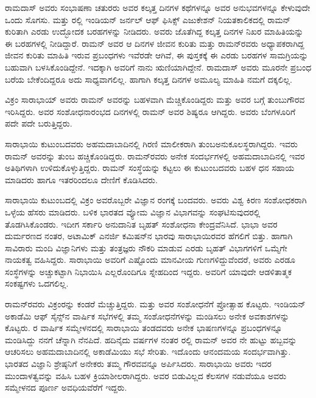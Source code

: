 ರಾಮದಾಸ್ ಅವರು ಸಂಭಾಷಣಾ ಚತುರರು ಅವರ ಕಲ್ಕತ್ತ ದಿನಗಳ ಕಥೆಗಳನ್ನೂ ಅವರ ಅನುಭವಗಳನ್ನೂ ಕೇಳುವುದೇ ಒಂದು ಸೊಗಸು.  ಮತ್ತು ರಲ್ಲಿ ಇಂಡಿಯನ್ ಜರ್ನಲ್ ಆಫ್ ಫಿಸಿಕ್ಸ್ ಎಜುಕೇಶನ್ ನಿಯತಕಾಲಿಕದಲ್ಲಿ ರಾಮನ್ ಕುರಿತಾಗಿ ಎರಡು ಉದ್ಭೋದಕ ಬರಹಗಳನ್ನು ನೀಡಿದರು. ಅವರು ಜೊತೆಗಿದ್ದ ಕಲ್ಕತ್ತ ದಿನಗಳ ನಿಖರ ಮಾಹಿತಿಯನ್ನು ಈ ಬರಹಗಳಲ್ಲಿ ನೀಡಿದ್ದಾರೆ. ರಾಮನ್ ಅವರ ಆ ದಿನಗಳ ಜೀವನ ಕುರಿತು ಮತ್ತು ರಾಮನ್‍ರವರು ಅಧ್ಯಾಪಕರಾಗಿದ್ದ ಜೀವನ ಕುರಿತು ಮಾಹಿತಿ ಇರುವ ಪ್ರಬಂಧಗಳು ಇವೆರಡೇ ಆಗಿವೆ, ಈ ಪುಸ್ತಕಕ್ಕೆ ಈ ಎರಡು ಬರಹಗಳ ಸಾಮಗ್ರಿಯನ್ನು ಬಹುವಾಗಿ ಬಳಸಿಕೊಂಡಿದ್ದೇನೆ. ಇದಕ್ಕಾಗಿ ಅವರಿಗೆ ನಾನು ಋಣಿಯಾಗಿದ್ದೇನೆ. ರಾಮದಾಸ್ ಅವರು ಮೂರನೇ ಪ್ರಬಂಧ ಬರೆಯ ಬೇಕೆಂದಿದ್ದರೂ ಅದು ಸಾಧ್ಯವಾಗಲಿಲ್ಲ. ಹಾಗಾಗಿ ಕಲ್ಕತ್ತ ದಿನಗಳ ಅಮೂಲ್ಯ ಮಾಹಿತಿ ನಮಗೆ ದಕ್ಕಲಿಲ್ಲ.



ವಿಕ್ರಂ ಸಾರಾಭಾಯ್ ಅವರು ರಾಮನ್ ಅವರನ್ನು ಬಹಳವಾಗಿ ಮೆಚ್ಚಿಕೊಂಡಿದ್ದರು ಮತ್ತು ಅವರ ಬಗ್ಗೆ ತುಂಬುಗೌರವ ಇರಿಸಿದ್ದರು. ಅವರ ಸಂಶೋಧನಾರಂಭದ ದಿನಗಳಲ್ಲಿ ರಾಮನ್ ಅವರ ಶಿಷ್ಯರೂ ಆಗಿದ್ದರು. ಅವರು ಬೆಂಗಳೂರಿಗೆ ಪದೇ ಪದೇ ಬರುತ್ತಿದ್ದರು.

ಸಾರಾಭಾಯಿ ಕುಟುಂಬದವರು ಅಹಮದಾಬಾದಿನಲ್ಲಿ ಗಿರಣಿ ಮಾಲೀಕರಾಗಿ ತುಂಬ\break ಅನುಕೂಲಸ್ಥರಾಗಿದ್ದರು. ಇವರು ರಾಮನ್ ಅವರನ್ನು ತುಂಬ ಹಚ್ಚಿಕೊಂಡಿದ್ದರು. ರಾಮನ್‍ರವರು ಅನೇಕ ಸಂದರ್ಭಗಳಲ್ಲಿ ಅಹಮದಾಬಾದಿನಲ್ಲಿ ಇವರ ಅತಿಥಿಗಳಾಗಿ ಉಳಿದುಕೊಳ್ಳುತ್ತಿದ್ದರು. ರಾಮನ್ ಸಂಸ್ಥೆಯನ್ನು ಕಟ್ಟಲು ಈ ಕುಟುಂಬದವರು ಬಹಳ ಧನ ಸಹಾಯ ಮಾಡಿದರು ಹಾಗೂ ಇತರರಿಂದಲೂ ದೇಣಿಗೆ ಕೊಡಿಸಿದರು.

ಸಾರಾಭಾಯಿ ಕುಟುಂಬದಲ್ಲಿ ವಿಕ್ರಂ ಅವರೊಬ್ಬರೇ ವಿಜ್ಞಾನ ರಂಗಕ್ಕೆ ಬಂದವರು. ಅವರು ವಿಶ್ವ ಕಿರಣ ಸಂಶೋಧಕರಾಗಿ ಒಳ್ಳೆಯ ಹೆಸರು ಮಾಡಿದರು. ಬಳಿಕ ಭಾರತದ ವ್ಯೋಮ ವಿಜ್ಞಾನ ವಿಭಾಗವನ್ನು ಸಂಘಟಿಸುವುದರಲ್ಲಿ ತೊಡಗಿಸಿಕೊಂಡರು. ಇದೀಗ ಸರ್ಕಾರಿ ಅನುದಾನಿತ ಬೃಹತ್ ಸಂಶೋಧನಾ ಕೇಂದ್ರವೆನಿಸಿದೆ. ಭಾಭಾ ಅವರ ದುರ್ಮರಣದ ನಂತರ, ಅಟಾಮಿಕ್ ಎನರ್ಜಿ ಕಮಿಷನ್‍ನ ಭಾರವು ಸಾರಾಭಾಯಿರವರ ಹೆಗಲಿಗೆ ಬಿತ್ತು. ಹಾಗಾಗಿ ಸಾವಿರಾರು ಮಂದಿ ವಿಜ್ಞಾನಿಗಳು ಮತ್ತು ತಂತ್ರಜ್ಞರು ನೌಕರಿ ಮಾಡುವ ಎರಡು ಬೃಹತ್ ವಿಭಾಗಗಳಿಗೆ ಒಮ್ಮೆಗೇ ನಾಯಕತ್ವ ವಹಿಸಿದ್ದರು. ಸಾರಾಭಾಯಿ ಅವರಿಗೆ ಎಷ್ಟೊಂದು ಮಾನವೀಯ ಗುಣಗಳಿದ್ದುವೆಂದರೆ, ಅವರು ಎರಡೂ ಸಂಸ್ಥೆಗಳನ್ನು ಅಚ್ಚುಕಟ್ಟಾಗಿ ನಿಭಾಯಿಸಿ ಎಲ್ಲರೊಂದಿಗೂ ಸ್ನೇಹದಿಂದ ಇದ್ದರು. ಅವರಿಗೆ ಯಾವುದೇ ಆಡಳಿತಾತ್ಮಕ ಸಂಕಷ್ಟಗಳು ಒದಗಲಿಲ್ಲ.

ರಾಮನ್‍ರವರು ವಿಕ್ರಂರನ್ನು ಕಂಡರೆ ಮೆಚ್ಚುತ್ತಿದ್ದರು. ಮತ್ತು ಅವರ ಸಂಶೋಧನೆಗೆ ಪ್ರೋತ್ಸಾಹ ಕೊಟ್ಟರು. ಇಂಡಿಯನ್ ಅಕಾಡೆಮಿ ಆಫ್ ಸೈನ್ಸ್‌ನ ವಾರ್ಷಿಕ ಸಭೆಗಳಲ್ಲಿ ತಮ್ಮ ಸಂಶೋಧನೆಗಳನ್ನು ಮಂಡಿಸಲು ಅನೇಕ ಅವಕಾಶಗಳನ್ನು ಕೊಟ್ಟರು. ರ ವಾರ್ಷಿಕ ಸಮ್ಮೇಳನದಲ್ಲಿ ಸಾರಾಭಾಯಿ ತಂಡದವರು ಅನೇಕ ಭಾಷಣಗಳನ್ನೂ ಪ್ರಬಂಧಗಳನ್ನೂ ಮಂಡಿಸಿದ್ದು ನನಗೆ ಚೆನ್ನಾಗಿ ನೆನಪಿದೆ. ಹದಿನೈದು ವರ್ಷಗಳ ನಂತರ ರಲ್ಲಿ ರಾಮನ್ ಅವರ ನೇ ಹುಟ್ಟು ಹಬ್ಬವನ್ನು ಆಚರಿಸಲು ಅಹಮದಾಬಾದಿನಲ್ಲಿ ಅಕಾಡೆಮಿಯು ಸಭೆ ಸೇರಿತು. ಇದೊಂದು ಆನಂದಮಯ ಸಂದರ್ಭವಾಗಿತ್ತು. ಭಾರತದ ವಿಜ್ಞಾನಿ ಶ್ರೇಷ್ಠನಿಗೆ ಅನೇಕರು ತಮ್ಮ ಗೌರವವನ್ನೂ ಅರ್ಪಿಸಿದರು. ಸಾರಾಭಾಯಿ ಅವರು ಇದರ ಮುಂದಾಳತ್ವವನ್ನು ವಹಿಸಿ ಬಹಳ ಕ್ರಿಯಾಶೀಲರಾಗಿದ್ದರು. ಅವರ ಬಿಡುವಿಲ್ಲದ ಕೆಲಸಗಳ ನಡುವೆಯೂ ಅವರು ಸಮ್ಮೇಳನದ ಪೂರ್ಣ ಅವಧಿಯವೆರೆಗೆ ಇದ್ದರು.

